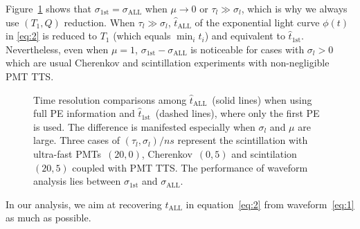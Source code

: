 Figure~\ref{fig:reso-diff} shows that $\sigma_{\mathrm{1st}}=\sigma_{\mathrm{ALL}}$ when $\mu \to 0$ or $\tau_l \gg \sigma_l$, which is why we always use $(T_1, Q)$ reduction. When $\tau_l \gg \sigma_l$, $\hat{t}_\mathrm{ALL}$ of the exponential light curve $\phi(t)$ in \eqref{eq:2} is reduced to $T_1$ (which equals $\min_i t_i$) and equivalent to $\hat{t}_\mathrm{1st}$. Nevertheless, even when $\mu = 1$, $\sigma_{\mathrm{1st}} - \sigma_{\mathrm{ALL}}$ is noticeable for cases with $\sigma_l > 0$ which are usual Cherenkov and scintillation experiments with non-negligible PMT TTS. 
\begin{figure}[H]
  \centering
  \resizebox{0.8\textwidth}{!}{}
  \caption{\label{fig:reso-diff} Time resolution comparisons among $\hat{t}_{\mathrm{ALL}}$~(solid lines) when using full PE information and $\hat{t}_\mathrm{1st}$~(dashed lines), where only the first PE is used. The difference is manifested especially when $\sigma_l$ and $\mu$ are large. Three cases of $(\tau_l, \sigma_l)/\si{ns}$ represent the scintillation with ultra-fast PMTs~$(20, 0)$, Cherenkov~$(0, 5)$ and scintilation~$(20, 5)$ coupled with PMT TTS. The performance of waveform analysis lies between $\sigma_{\mathrm{1st}}$ and $\sigma_{\mathrm{ALL}}$. }
\end{figure}

In our analysis, we aim at recovering $\hat{t}_\mathrm{ALL}$ in equation~\eqref{eq:2} from waveform~\eqref{eq:1} as much as possible. 
